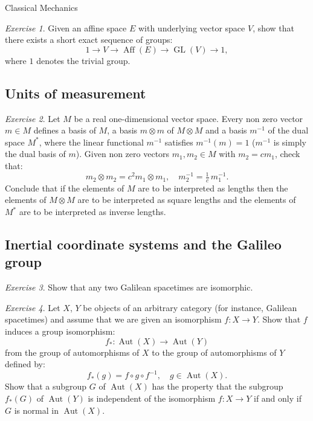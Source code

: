 \documentclass[oneside,a4paper,11pt]{amsbook}
\DeclareMathOperator{\Aut}{Aut}
\DeclareMathOperator{\Aff}{Aff}
\DeclareMathOperator{\GL}{GL}
\theoremstyle{remark}\newtheorem{exercise}{Exercise}[chapter]
\theoremstyle{plain}\newtheorem{teo}{Theorem}[section]
\theoremstyle{plain}\newtheorem{lem}[teo]{Lemma}
\theoremstyle{plain}\newtheorem{prop}[teo]{Proposition}
\theoremstyle{plain}\newtheorem{cor}[teo]{Corollary}
\theoremstyle{definition}\newtheorem{defin}[teo]{Definition}
\theoremstyle{remark}\newtheorem{rem}[teo]{Remark}
\theoremstyle{definition}\newtheorem{notation}[teo]{Notation}
\theoremstyle{definition}\newtheorem{convention}[teo]{Convention}
\theoremstyle{definition}\newtheorem{example}[teo]{Example}
\numberwithin{section}{chapter}
\numberwithin{equation}{section}
\begin{document}
\begin{chapter}{Classical Mechanics}
\begin{exercise}\label{exe:shortexact}
Given an affine space $E$ with underlying vector space $V$, show that there exists a short exact sequence of groups:
\[1\longrightarrow V\longrightarrow\Aff(E)\longrightarrow\GL(V)\longrightarrow1,\]
where $1$ denotes the trivial group.
\end{exercise}

\subsection*{Units of measurement}

\begin{exercise}\label{exe:units}
Let $M$ be a real one-dimensional vector space. Every non zero vector $m\in M$ defines a basis of $M$, a basis
$m\otimes m$ of $M\otimes M$ and a basis $m^{-1}$ of the dual space $M^*$, where the linear functional
$m^{-1}$ satisfies $m^{-1}(m)=1$ ($m^{-1}$ is simply
the dual basis of $m$). Given non zero vectors $m_1,m_2\in M$ with $m_2=cm_1$, check that:
\[m_2\otimes m_2=c^2m_1\otimes m_1,\quad m_2^{-1}=\tfrac1c\,m_1^{-1}.\]
Conclude that if the elements of $M$ are to be interpreted as lengths then the elements of $M\otimes M$ are to
be interpreted as square lengths and the elements of $M^*$ are to be interpreted as inverse lengths.
\end{exercise}

\subsection*{Inertial coordinate systems and the Galileo group}

\begin{exercise}\label{exe:isoGalileo}
Show that any two Galilean spacetimes are isomorphic.
\end{exercise}

\begin{exercise}\label{exe:isoAutAut}
Let $X$, $Y$ be objects of an arbitrary category (for instance, Galilean spacetimes) and assume that we are given
an isomorphism $f:X\to Y$. Show that $f$ induces a group isomorphism:
\[f_*:\Aut(X)\longrightarrow\Aut(Y)\]
from the group of automorphisms of $X$ to the group of automorphisms of $Y$ defined by:
\[f_*(g)=f\circ g\circ f^{-1},\quad g\in\Aut(X).\]
Show that a subgroup $G$ of $\Aut(X)$ has the property that the subgroup $f_*(G)$ of $\Aut(Y)$ is independent
of the isomorphism $f:X\to Y$ if and only if $G$ is normal in $\Aut(X)$.
\end{exercise}


\end{chapter}
\end{document}
